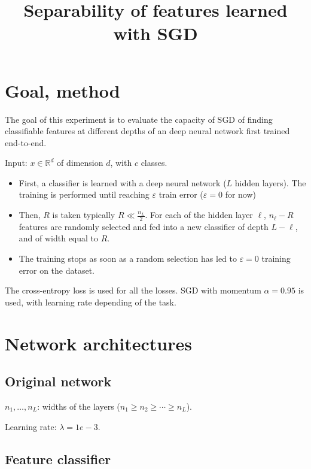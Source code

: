 \documentclass[a4paper]{article}
\title{Separability of features learned with SGD}
\author{}
\newcommand{\bR}{\mathbb{R}}
\begin{document}
\maketitle

\section{Goal, method}

The goal of this experiment is to evaluate the capacity of SGD of finding
classifiable features at different depths of an deep neural network first
trained end-to-end.

Input: $x \in \bR^d$ of dimension $d$, with $c$ classes.
\begin{itemize}
    \item
        First, a classifier is learned with a deep neural network ($L$ hidden
        layers). The training is performed until reaching $\varepsilon$ train
        error ($\varepsilon = 0$ for now)
    \item
        Then, $R$ is taken typically $R \ll \frac{n_L}{2}$. For each of the
        hidden layer $\ell$, $n_\ell -R$ features are randomly selected and fed
        into a new classifier of depth $L - \ell$, and of width equal to $R$.
    \item
        The training stops as soon as a random selection has led to $\varepsilon
        = 0$ training error on the dataset.
\end{itemize}

The cross-entropy loss is used for all the losses. SGD with momentum $\alpha =
0.95$ is used, with learning rate depending of the task.

\section{Network architectures}

\subsection{Original network}

$n_1, \ldots, n_L$: widths of the layers ($n_1 \geq n_2 \geq \cdots \geq n_L$).

Learning rate: $\lambda = 1e-3$.

\subsection{Feature classifier}
\end{document}

